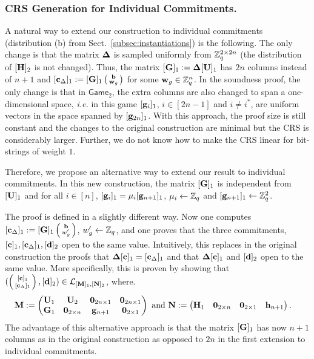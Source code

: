 \subsubsection{CRS Generation for Individual Commitments.}
A natural way to extend our construction to individual commitments (distribution (b) from Sect.\ \ref{subsec:instantiations}) is the following. The only change is that the matrix $\mathbf{{\Delta}}$ is sampled uniformly from  $\mathbb{Z}_q^{2 \times 2n}$ (the distribution of $[{\mathbf{{H}}}]_2$ is not changed). Thus, the matrix 
$[\mathbf{{G}}]_1:=\mathbf{{\Delta}} [\mathbf{{U}}]_1$ has $2n$ columns instead of $n+1$ and 
$[\mathbf{c}_{\Delta}]_1 := [\mathbf{{G}}]_1 \left(\begin{smallmatrix}\mathbf{b} \\ \mathbf{w}_g\end{smallmatrix}\right)$ for some $\mathbf{w}_g \in \mathbb{Z}_q^{n}$.   
In the soundness proof, the only change is that in $\mathsf{Game}_2$, the extra columns are also changed to span a one-dimensional space, \textit{i.e.} in this game $[\mathbf{g}_{i}]_1$, $i \in [2n-1]$ and $i \neq i^*$, are uniform vectors in the space spanned by $[\mathbf{g}_{2n}]_1$.
With this approach, the proof size is still constant and the changes to the original construction are minimal but the CRS is considerably larger. Further, we do not know how to make the CRS linear for bit-strings of weight $1$. 

Therefore, we propose an alternative way to extend our result to individual commitments. In this new construction, the matrix $[\mathbf{{G}}]_1$ is independent from $[\mathbf{{U}}]_1$ and for all $i \in [n]$, $[\mathbf{g}_{i}]_1 = \mu_i [\mathbf{g}_{n+1}]_1$, $\mu_i \gets \mathbb{Z}_q$ and   $[\mathbf{g}_{n+1}]_1\gets\mathbb{Z}_q^2$. 

The proof is defined in a slightly different way. Now one computes $[\mathbf{c}_\Delta]_1:=[\mathbf{{G}}]_1\left(\begin{smallmatrix}\mathbf{b}\\w'_g\end{smallmatrix}\right)$, $w'_g\gets\mathbb{Z}_q$, and one proves that the three commitments, $[\mathbf{c}]_1,[\mathbf{c}_\Delta]_1,[\mathbf{d}]_2$ open to the same value.  Intuitively, this replaces in the original construction the proofs that $\mathbf{{\Delta}}[\mathbf{c}]_1=[\mathbf{c}_\Delta]_1$ and that $\mathbf{{\Delta}}[\mathbf{c}]_1$ and $[\mathbf{d}]_2$ open to the same value. More specifically, this is proven by showing that $(\left(\begin{smallmatrix}{[\mathbf{c}]_1}\\{[\mathbf{c}_\Delta]_1}\end{smallmatrix}\right), [\mathbf{d}]_2)\in\mathcal{L}_{[\mathbf{{M}}]_1,[\mathbf{{N}}]_2}$, where.
\begin{align*}
&\mathbf{{M}} := 
\left(\begin{matrix}
    \mathbf{{U}}_1 & \mathbf{{U}}_2           & \mathbf{{0}}_{2n\times 1} & \mathbf{{0}}_{2n\times 1}\\
    \mathbf{G}_1      & \mathbf{{0}}_{2\times n} & \mathbf{g}_{n+1}             & \mathbf{{0}}_{2\times 1}\\
\end{matrix}\right)
\text{ and }
\mathbf{{N}} :=
\left(\begin{matrix}
    \mathbf{H}_1      & \mathbf{{0}}_{2\times n} & \mathbf{{0}}_{2\times 1}  & \mathbf{h}_{n+1}
\end{matrix}\right).
\end{align*}
The advantage of this alternative approach is that the matrix $[\mathbf{{G}}]_1$ has now $n+1$ columns as in the original construction as opposed to $2n$ in the first extension to individual commitments.  


